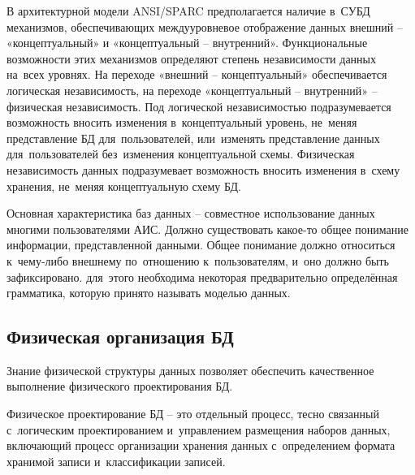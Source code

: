 \documentclass{ou}
\begin{document}
В архитектурной модели ANSI/SPARC предполагается наличие в~СУБД механизмов, обеспечивающих междууровневое отображение данных внешний -- «концептуальный» и «концептуальный -- внутренний». Функциональные возможности этих механизмов определяют степень независимости данных на~всех уровнях. На переходе «внешний -- концептуальный» обеспечивается логическая независимость, на переходе «концептуальный -- внутренний» -- физическая независимость. Под логической независимостью подразумевается возможность вносить изменения в~концептуальный уровень, не~меняя представление БД для~пользователей, или~изменять представление данных для~пользователей без~изменения концептуальной схемы. Физическая независимость данных подразумевает возможность вносить изменения в~схему хранения, не~меняя концептуальную схему БД.

Основная характеристика баз данных -- совместное использование данных многими пользователями АИС. Должно существовать какое-то общее понимание информации, представленной данными. Общее понимание должно относиться к~чему-либо внешнему по~отношению к~пользователям, и~оно должно быть зафиксировано. для~этого необходима некоторая предварительно определённая грамматика, которую принято называть моделью данных.
\subsection{Физическая организация БД}
Знание физической структуры данных позволяет обеспечить качественное выполнение физического проектирования БД.

Физическое проектирование БД -- это отдельный процесс, тесно связанный с~логическим проектированием и~управлением размещения наборов данных, включающий процесс организации хранения данных с~определением формата хранимой записи и~классификации записей.
\end{document}
